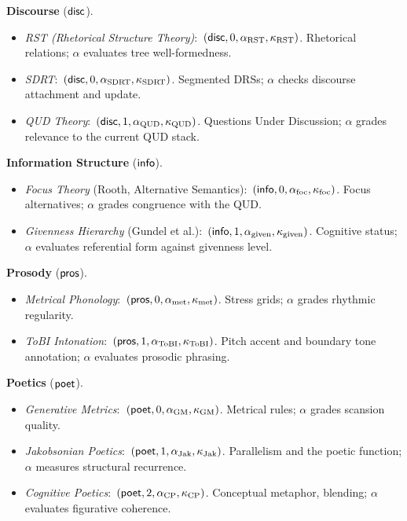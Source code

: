 \noindent\textbf{Discourse} ($\mathsf{disc}$).
\begin{itemize}[nosep]
\item \emph{RST (Rhetorical Structure Theory)}:\ $({\mathsf{disc}}, 0,
  \alpha_{\mathrm{RST}}, \kappa_{\mathrm{RST}})$.
  Rhetorical relations; $\alpha$ evaluates tree well-formedness.
\item \emph{SDRT}:\ $({\mathsf{disc}}, 0, \alpha_{\mathrm{SDRT}},
  \kappa_{\mathrm{SDRT}})$.  Segmented DRSs; $\alpha$ checks
  discourse attachment and update.
\item \emph{QUD Theory}:\ $({\mathsf{disc}}, 1, \alpha_{\mathrm{QUD}},
  \kappa_{\mathrm{QUD}})$.  Questions Under Discussion; $\alpha$
  grades relevance to the current QUD stack.
\end{itemize}

\noindent\textbf{Information Structure} ($\mathsf{info}$).
\begin{itemize}[nosep]
\item \emph{Focus Theory} (Rooth, Alternative Semantics):\
  $({\mathsf{info}}, 0, \alpha_{\mathrm{foc}}, \kappa_{\mathrm{foc}})$.
  Focus alternatives; $\alpha$ grades congruence with the QUD.
\item \emph{Givenness Hierarchy} (Gundel et al.):\
  $({\mathsf{info}}, 1, \alpha_{\mathrm{given}}, \kappa_{\mathrm{given}})$.
  Cognitive status; $\alpha$ evaluates referential form against
  givenness level.
\end{itemize}

\noindent\textbf{Prosody} ($\mathsf{pros}$).
\begin{itemize}[nosep]
\item \emph{Metrical Phonology}:\
  $({\mathsf{pros}}, 0, \alpha_{\mathrm{met}}, \kappa_{\mathrm{met}})$.
  Stress grids; $\alpha$ grades rhythmic regularity.
\item \emph{ToBI Intonation}:\
  $({\mathsf{pros}}, 1, \alpha_{\mathrm{ToBI}}, \kappa_{\mathrm{ToBI}})$.
  Pitch accent and boundary tone annotation; $\alpha$ evaluates
  prosodic phrasing.
\end{itemize}

\noindent\textbf{Poetics} ($\mathsf{poet}$).
\begin{itemize}[nosep]
\item \emph{Generative Metrics}:\
  $({\mathsf{poet}}, 0, \alpha_{\mathrm{GM}}, \kappa_{\mathrm{GM}})$.
  Metrical rules; $\alpha$ grades scansion quality.
\item \emph{Jakobsonian Poetics}:\
  $({\mathsf{poet}}, 1, \alpha_{\mathrm{Jak}}, \kappa_{\mathrm{Jak}})$.
  Parallelism and the poetic function; $\alpha$ measures structural
  recurrence.
\item \emph{Cognitive Poetics}:\
  $({\mathsf{poet}}, 2, \alpha_{\mathrm{CP}}, \kappa_{\mathrm{CP}})$.
  Conceptual metaphor, blending; $\alpha$ evaluates figurative
  coherence.
\end{itemize}

